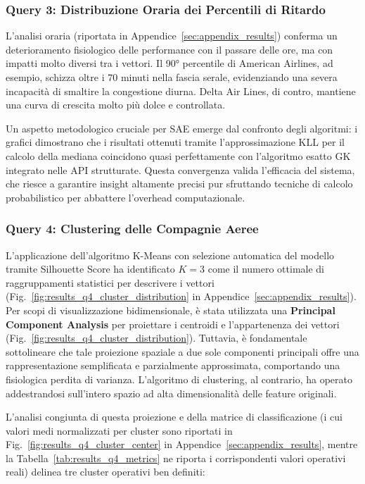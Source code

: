 \documentclass[conference]{IEEEtran}
\begin{document}
\subsubsection{Query 3: Distribuzione Oraria dei Percentili di Ritardo}
L'analisi oraria (riportata in Appendice~\ref{sec:appendix_results}) conferma un deterioramento fisiologico delle performance con il passare delle ore, ma con impatti molto diversi tra i vettori.
Il 90° percentile di American Airlines, ad esempio, schizza oltre i $70$ minuti nella fascia serale, evidenziando una severa incapacità di smaltire la congestione diurna.
Delta Air Lines, di contro, mantiene una curva di crescita molto più dolce e controllata.

Un aspetto metodologico cruciale per SAE emerge dal confronto degli algoritmi: i grafici dimostrano che i risultati ottenuti tramite l'approssimazione KLL per il calcolo della mediana coincidono quasi perfettamente con l'algoritmo esatto GK integrato nelle API strutturate.
Questa convergenza valida l'efficacia del sistema, che riesce a garantire insight altamente precisi pur sfruttando tecniche di calcolo probabilistico per abbattere l'overhead computazionale.

\subsubsection{Query 4: Clustering delle Compagnie Aeree}
L'applicazione dell'algoritmo K-Means con selezione automatica del modello tramite Silhouette Score ha identificato $K=3$ come il numero ottimale di raggruppamenti statistici per descrivere i vettori (Fig.~\ref{fig:results_q4_cluster_distribution} in Appendice~\ref{sec:appendix_results}).
Per scopi di visualizzazione bidimensionale, è stata utilizzata una \textbf{Principal Component Analysis} per proiettare i centroidi e l'appartenenza dei vettori (Fig.~\ref{fig:results_q4_cluster_distribution}). Tuttavia, è fondamentale sottolineare che tale proiezione spaziale a due sole componenti principali offre una rappresentazione semplificata e parzialmente approssimata, comportando una fisiologica perdita di varianza.
L'algoritmo di clustering, al contrario, ha operato addestrandosi sull'intero spazio ad alta dimensionalità delle feature originali.

L'analisi congiunta di questa proiezione e della matrice di classificazione (i cui valori medi normalizzati per cluster sono riportati in Fig.~\ref{fig:results_q4_cluster_center} in Appendice~\ref{sec:appendix_results}, mentre la Tabella~\ref{tab:results_q4_metrics} ne riporta i corrispondenti valori operativi reali) delinea tre cluster operativi ben definiti:
\end{document}
